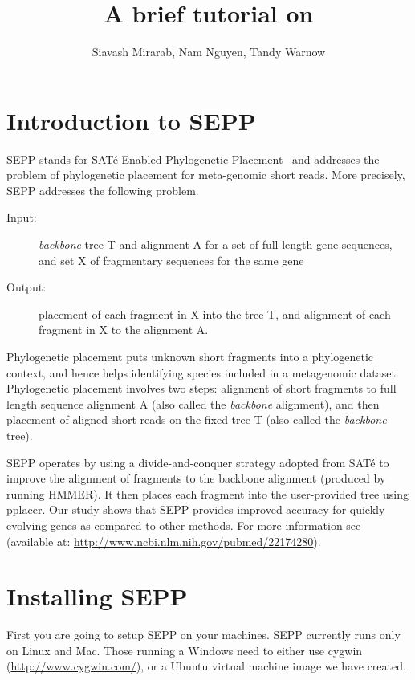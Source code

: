 \documentclass[11pt]{article} %
\title{A brief tutorial on \sepp }
\author{Siavash Mirarab, Nam Nguyen, Tandy Warnow}
\newcommand{\sepp}{SEPP\xspace}
\newcommand{\sate}{SAT\'{e}\xspace}
\newcommand{\pplacer}{pplacer\xspace}
\newcommand{\hmmer}{HMMER\xspace}
\begin{document}
\maketitle
\tableofcontents
\newpage
\section{Introduction to \sepp}
\sepp stands for \sate-Enabled Phylogenetic Placement~\cite{sepp} and addresses the problem of phylogenetic placement for meta-genomic short reads. More precisely, \sepp addresses the following problem.

\begin{description}
\item [Input:] {\em backbone} tree T and alignment A for a set of full-length gene sequences, and set X of fragmentary sequences for the same gene

\item [Output:] placement of each fragment in X into the tree T, and alignment of each fragment in X to the alignment A.

\end{description}

Phylogenetic placement puts unknown short fragments into a phylogenetic context, and hence helps identifying species included in a metagenomic dataset.  
Phylogenetic placement involves two steps: alignment of short fragments to full length sequence alignment A (also called the {\em backbone} alignment), and then placement of aligned short reads on the fixed tree T (also called the {\em backbone} tree). 

\sepp operates by using a divide-and-conquer strategy adopted from \sate \cite{liu09science,sate2} to improve the alignment of fragments to the
backbone alignment (produced by running \hmmer \cite{hmmer}). 
It then places each fragment into the user-provided tree using \pplacer \cite{pplacer}. 
Our study shows that \sepp provides improved accuracy for quickly evolving genes as compared to other methods. For more information see \cite{sepp} (available at: \url{http://www.ncbi.nlm.nih.gov/pubmed/22174280}).

\section{Installing \sepp}
First you are going to setup \sepp on your machines. \sepp currently runs only on Linux and Mac. Those running a Windows need to either use cygwin (\url{http://www.cygwin.com/}), or a Ubuntu virtual machine image we have created. 
 
\end{document}

